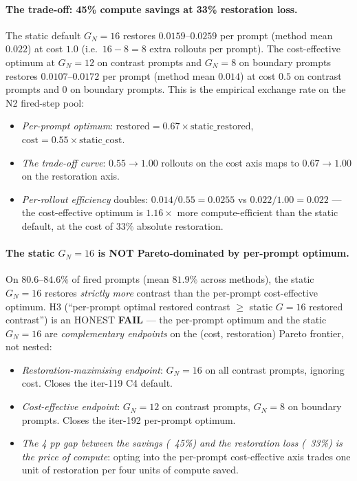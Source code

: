 \documentclass{article}
\begin{document}
\paragraph{The trade-off: 45\% compute savings at 33\% restoration loss.}

The static default $G_N = 16$ restores $0.0159$--$0.0259$ per prompt
(method mean $0.022$) at cost $1.0$ (i.e.\ $16 - 8 = 8$ extra rollouts
per prompt). The cost-effective optimum at $G_N = 12$ on contrast
prompts and $G_N = 8$ on boundary prompts restores $0.0107$--$0.0172$
per prompt (method mean $0.014$) at cost $0.5$ on contrast prompts
and $0$ on boundary prompts. This is the empirical exchange rate on
the N2 fired-step pool:

\begin{itemize}
\item \emph{Per-prompt optimum}: $\mathrm{restored} = 0.67 \times \mathrm{static\_restored}$,
$\mathrm{cost} = 0.55 \times \mathrm{static\_cost}$.
\item \emph{The trade-off curve}: $0.55 \to 1.00$ rollouts on the cost
axis maps to $0.67 \to 1.00$ on the restoration axis.
\item \emph{Per-rollout efficiency} doubles: $0.014 / 0.55 = 0.0255$
vs $0.022 / 1.00 = 0.022$ --- the cost-effective optimum is
$1.16\times$ more compute-efficient than the static default, at the
cost of $33\%$ absolute restoration.
\end{itemize}

\paragraph{The static $G_N = 16$ is NOT Pareto-dominated by per-prompt optimum.}

On $80.6$--$84.6\%$ of fired prompts (mean $81.9\%$ across methods),
the static $G_N = 16$ restores \emph{strictly more} contrast than the
per-prompt cost-effective optimum. H3 (``per-prompt optimal restored
contrast $\ge$ static $G{=}16$ restored contrast'') is an HONEST
\textbf{FAIL} --- the per-prompt optimum and the static $G_N = 16$ are
\emph{complementary endpoints} on the (cost, restoration) Pareto
frontier, not nested:

\begin{itemize}
\item \emph{Restoration-maximising endpoint}: $G_N = 16$ on all
contrast prompts, ignoring cost. Closes the iter-119 C4 default.
\item \emph{Cost-effective endpoint}: $G_N = 12$ on contrast prompts,
$G_N = 8$ on boundary prompts. Closes the iter-192 per-prompt
optimum.
\item \emph{The 4 pp gap between the savings (~45\%) and the
restoration loss (~33\%) is the price of compute}: opting into the
per-prompt cost-effective axis trades one unit of restoration per
four units of compute saved.
\end{itemize}
\end{document}
